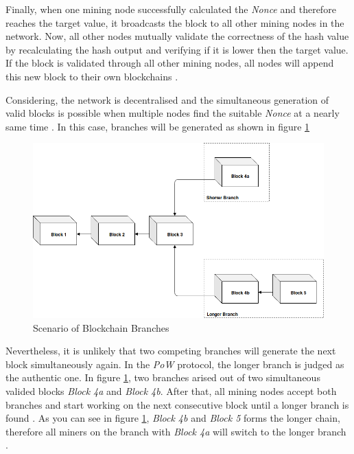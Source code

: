 Finally, when one mining node successfully calculated the \textit{Nonce} and therefore reaches the target value, 
it broadcasts the block to all other mining nodes in the network. Now, all other nodes mutually validate the correctness of the hash value
by recalculating the hash output and verifying if it is lower then the target value. 
If the block is validated through all other mining nodes, all nodes will append this new block to their own blockchains .  

Considering, the network is decentralised and the simultaneous generation of valid blocks is possible when multiple nodes find 
the suitable \textit{Nonce} at a nearly same time . In this case, branches will be generated as shown in figure \ref{figure:blockchain_branches}

\begin{figure}[htbp]
	\centering
	\includegraphics[width=.9\linewidth]{./figures/blockchain_branches.png}
	\caption{Scenario of Blockchain Branches}
	\label{figure:blockchain_branches}
\end{figure}

Nevertheless, it is unlikely that two competing branches will generate the next block simultaneously again. 
In the \textit{PoW} protocol, the longer branch is judged as the authentic one. 
In figure \ref{figure:blockchain_branches}, two branches arised out of 
two simultaneous valided blocks \textit{Block 4a} and \textit{Block 4b}. 
After that, all mining nodes accept both branches and start working on 
the next consecutive block until a longer branch is found . 
As you can see in figure \ref{figure:blockchain_branches}, \textit{Block 4b} and \textit{Block 5} forms the longer 
chain, therefore all miners on the branch with \textit{Block 4a} will switch to 
the longer branch . 

